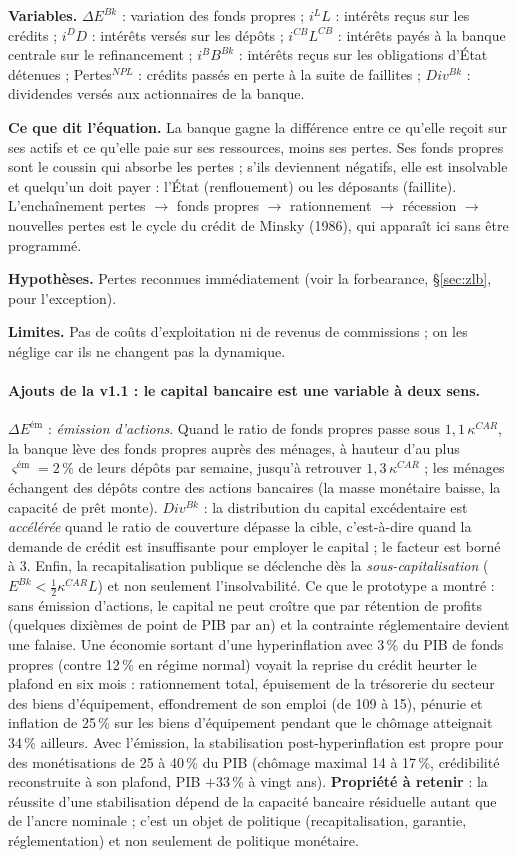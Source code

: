 \documentclass[11pt,a4paper]{article}
\newcommand{\variables}{\par\noindent\textbf{Variables.} }
\newcommand{\sens}{\par\noindent\textbf{Ce que dit l'équation.} }
\newcommand{\hyp}{\par\noindent\textbf{Hypothèses.} }
\newcommand{\limites}{\par\noindent\textbf{Limites.} }
\begin{document}
\begin{lecture}
\variables $\Delta E^{Bk}$ : variation des fonds propres ; $i^L L$ : intérêts reçus sur les crédits ; $i^D D$ : intérêts versés sur les dépôts ; $i^{CB}L^{CB}$ : intérêts payés à la banque centrale sur le refinancement ; $i^B B^{Bk}$ : intérêts reçus sur les obligations d'État détenues ; Pertes$^{NPL}$ : crédits passés en perte à la suite de faillites ; $Div^{Bk}$ : dividendes versés aux actionnaires de la banque.
\sens La banque gagne la différence entre ce qu'elle reçoit sur ses actifs et ce qu'elle paie sur ses ressources, moins ses pertes. Ses fonds propres sont le coussin qui absorbe les pertes ; s'ils deviennent négatifs, elle est insolvable et quelqu'un doit payer : l'État (renflouement) ou les déposants (faillite). L'enchaînement pertes $\to$ fonds propres $\to$ rationnement $\to$ récession $\to$ nouvelles pertes est le cycle du crédit de Minsky (1986), qui apparaît ici sans être programmé.
\hyp Pertes reconnues immédiatement (voir la forbearance, \S\ref{sec:zlb}, pour l'exception).
\limites Pas de coûts d'exploitation ni de revenus de commissions ; on les néglige car ils ne changent pas la dynamique.
\paragraph{Ajouts de la v1.1 : le capital bancaire est une variable à deux sens.} $\Delta E^{\text{ém}}$ : \emph{émission d'actions}. Quand le ratio de fonds propres passe sous $1{,}1\,\kappa^{CAR}$, la banque lève des fonds propres auprès des ménages, à hauteur d'au plus $\varsigma^{\text{ém}}=2\,\%$ de leurs dépôts par semaine, jusqu'à retrouver $1{,}3\,\kappa^{CAR}$ ; les ménages échangent des dépôts contre des actions bancaires (la masse monétaire baisse, la capacité de prêt monte). $Div^{Bk}$ : la distribution du capital excédentaire est \emph{accélérée} quand le ratio de couverture dépasse la cible, c'est-à-dire quand la demande de crédit est insuffisante pour employer le capital ; le facteur est borné à 3. Enfin, la recapitalisation publique se déclenche dès la \emph{sous-capitalisation} ($E^{Bk}<\tfrac12\kappa^{CAR}L$) et non seulement l'insolvabilité.
Ce que le prototype a montré : sans émission d'actions, le capital ne peut croître que par rétention de profits (quelques dixièmes de point de PIB par an) et la contrainte réglementaire devient une falaise. Une économie sortant d'une hyperinflation avec 3\,\% du PIB de fonds propres (contre 12\,\% en régime normal) voyait la reprise du crédit heurter le plafond en six mois : rationnement total, épuisement de la trésorerie du secteur des biens d'équipement, effondrement de son emploi (de 109 à 15), pénurie et inflation de 25\,\% sur les biens d'équipement pendant que le chômage atteignait 34\,\% ailleurs. Avec l'émission, la stabilisation post-hyperinflation est propre pour des monétisations de 25 à 40\,\% du PIB (chômage maximal 14 à 17\,\%, crédibilité reconstruite à son plafond, PIB $+33\,\%$ à vingt ans). \textbf{Propriété à retenir} : la réussite d'une stabilisation dépend de la capacité bancaire résiduelle autant que de l'ancre nominale ; c'est un objet de politique (recapitalisation, garantie, réglementation) et non seulement de politique monétaire.
\end{lecture}
\end{document}
